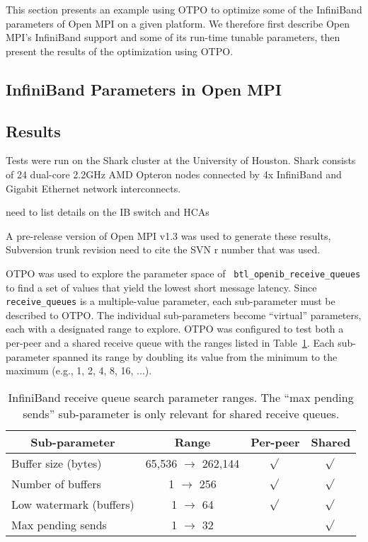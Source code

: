 This section presents an example using OTPO to optimize some of the
InfiniBand parameters of Open MPI on a given platform.  We therefore
first describe Open MPI's InfiniBand support and some of its run-time
tunable parameters, then present the results of the optimization using
OTPO.

\subsection{InfiniBand Parameters in Open MPI}



\subsection{Results}

Tests were run on the Shark cluster at the University of Houston.
Shark consists of 24 dual-core 2.2GHz AMD Opteron nodes connected by
4x InfiniBand and Gigabit Ethernet network interconnects.  

{\Large need to list details on the IB switch and HCAs}

A pre-release version of Open MPI v1.3 was used to generate these
results, Subversion trunk revision {\Large need to cite the SVN r
  number that was used}.

OTPO was used to explore the parameter space of {\tt
  btl\_\-openib\_\-receive\_\-queues} to find a set of values that
yield the lowest short message latency.  Since {\tt receive\_\-queues}
is a multiple-value parameter, each sub-parameter must be described to
OTPO.  The individual sub-parameters become ``virtual'' parameters,
each with a designated range to explore.  OTPO was configured to test
both a per-peer and a shared receive queue with the ranges listed in
Table~\ref{table:eval-queue-search-params}.  Each sub-parameter
spanned its range by doubling its value from the minimum to the
maximum (e.g., 1, 2, 4, 8, 16, ...).

\def\yes{$\sqrt{}$}

\begin{table}[tb]
\centering
\caption{InfiniBand receive queue search parameter ranges.  The ``max
  pending sends'' sub-parameter is only relevant for shared receive
  queues.}
\label{table:eval-queue-search-params} 
\begin{tabular}{|l|c|c|c|} 
\multicolumn{1}{c}{Sub-parameter} &
\multicolumn{1}{c}{Range} &
\multicolumn{1}{c}{Per-peer} &
\multicolumn{1}{c}{Shared} \\
\hline
Buffer size (bytes) & 65,536 $\rightarrow$ 262,144 & \yes & \yes \\
Number of buffers & 1 $\rightarrow$ 256 & \yes & \yes \\
Low watermark (buffers) & 1 $\rightarrow$ 64  & \yes & \yes \\
Max pending sends & 1 $\rightarrow$ 32 & & \yes \\
\hline
\end{tabular}
\end{table}

